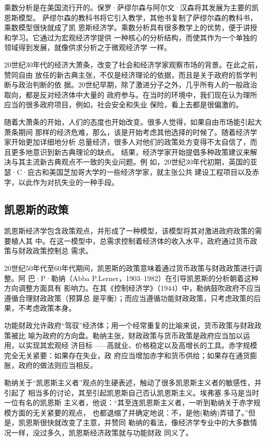 乘数分析是在美国流行开的。保罗·萨缪尔森与阿尔文·汉森将其发展为主要的凯恩斯模型。
萨缪尔森的教科书将它引入教学，其他书复制了萨缪尔森的教科书，乘数模型很快就成了凯
恩斯经济学。乘数分析具有很多教学上的优势，便于讲授和学习。它通过为宏观经济学提供
一种核心的分析结构，而使其作为一个单独的领域得到发展，就像供求分析之于微观经济学
一样。

20世纪30年代的经济大萧条，改变了社会和经济学家观察市场的背景。在此之前，赞同自由
放任的新古典主张，不仅是经济理论的依据，而且是关于政府的哲学判断与政治判断的依
据。20世纪早期，除了激进分子之外，几乎所有人的一般政治取向，都是反对经济体中大量的
政府参与。在当时的环境中，我们现在认为理所应当的很多政府项目，例如，社会安全和失业
保险，看上去都是很偏激的。

随着大萧条的开始，人们的态度也开始改变。很多人觉得，如果自由市场能引起大萧条期间
那样的经济危难，那么，该是开始考虑其他选择的时候了。随着经济学家开始更加详细地分析
总量经济，很多人对他们的政策处方变得不太自信了，而且更多地意识到新古典理论的缺点。
结果，经济学家开始提倡多种政策建议来解决与其主流新古典观点不一致的失业问题。例
如，20世纪30年代初期，英国的亚瑟·C·庇古和美国芝加哥大学的一些经济学家，就主张公共
建设工程项目以及赤字，以此作为对抗失业的一种手段。

\subsection{凯恩斯的政策}

凯恩斯经济学包含政策观点，并形成了一种模型，该模型将其对激进政府政策的需要植人其
中。在这一模型中，总需求控制着经济体的收入水平，政府通过货币政策与财政政策控制总
需求。

20世纪50年代至60年代期间，凯恩斯的政策意味着通过货币政策与财政政策进行调整。阿
巴·P·勒纳（Abba P.Lerner，1903--1982）在引导凯恩斯的分析朝着这种方向调整方面具有
影响力。在其《控制经济学》（1944）中，勒纳鼓吹政府不应当遵循合理财政政策（预算总
是平衡）；而应当遵循功能财政政策，只考虑政策的后果，不考虑政策本身。

功能财政允许政府“驾驭”经济体；用一个经常重复的比喻来说，货币政策与财政政策被比
喻为政府的方向盘。勒纳主张，财政政策与货币政策是政府应当加以运用，以实现其宏观经
济目标——高就业、价格稳定以及高增长的工具。赤字规模完全无关紧要：如果存在失业，政
府应当增加赤字和货币供给；如果存在通货膨胀，政府的做法则应当相反。

勒纳关于“凯恩斯主义者”观点的生硬表述，触动了很多凯恩斯主义者的敏感性，并引起了
相当多的讨论，其至引起凯恩斯自己否认凯恩斯主义。埃弗塞.多马是当时一位有名的凯恩斯
主义者，他说：“其至连凯恩斯主义者，一听到勒纳关于赤字规模方面的无关紧要的观点，
也都退缩了并确定地说：不，是他(勒纳)弄错了。”但是，凯恩斯很快就改变了主意，并赞同
勒纳的看法，像经济学专业中的大多数情况一样，没过多久，凯恩斯经济政策就与功能财政
同义了。

